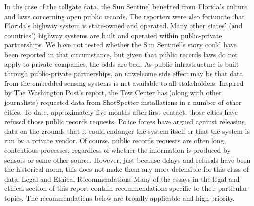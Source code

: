 \begin{itemize}
In the case of the tollgate data, the Sun Sentinel benefited from Florida's
culture and laws concerning open public records. The reporters were also
fortunate that Florida's highway system is state-owned and operated. Many
other states' (and countries') highway systems are built and operated within
public-private partnerships. We have not tested whether the Sun Sentinel's
story could have been reported in that circumstance, but given that public
records laws do not apply to private companies, the odds are bad. As public
infrastructure is built through public-private partnerships, an unwelcome
side effect may be that data from the embedded sensing systems is not available
to all stakeholders.
Inspired by The Washington Post's report, the Tow Center has (along with
other journalists) requested data from ShotSpotter installations in a number
of other cities. To date, approximately five months after first contact, those
cities have refused those public records requests. Police forces have argued
against releasing data on the grounds that it could endanger the system
itself or that the system is run by a private vendor. Of course, public records
requests are often long, contentious processes, regardless of whether the
information is produced by sensors or some other source. However, just
because delays and refusals have been the historical norm, this does not
make them any more defensible for this class of data.
Legal and Ethical Recommendations
Many of the essays in the legal and ethical section of this report contain
recommendations specific to their particular topics. The recommendations
below are broadly applicable and high-priority.


\end{itemize}
